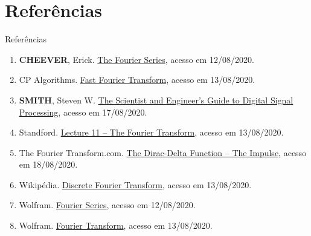 \section{Referências}

\begin{frame}[fragile]{Referências}

    \begin{enumerate}
        \item \textbf{CHEEVER}, Erick. \href{https://lpsa.swarthmore.edu/Fourier/Series/WhyFS.html}
            {The Fourier Series}, acesso em 12/08/2020.

        \item CP Algorithms. \href{https://cp-algorithms.com/algebra/fft.html}{Fast Fourier
            Transform}, acesso em 13/08/2020.
 
        \item \textbf{SMITH}, Steven W. \href{https://www.dspguide.com/ch12/2.htm}{The Scientist
            and Engineer's Guide to Digital Signal Processing}, acesso em 17/08/2020.
 
        \item Standford. \href{https://web.stanford.edu/class/ee102/lectures/fourtran}{Lecture 11
            -- The Fourier Transform}, acesso em 13/08/2020.

        \item The Fourier Transform.com. \href{http://www.thefouriertransform.com/pairs/impulse.php}{The Dirac-Delta Function -- The Impulse}, acesso em 18/08/2020.

        \item Wikipédia. \href{https://en.wikipedia.org/wiki/Discrete_Fourier_transform}{Discrete
            Fourier Transform}, acesso em 13/08/2020.
 
        \item Wolfram. \href{https://mathworld.wolfram.com/FourierSeries.html}{Fourier Series},
            acesso em 12/08/2020.

        \item Wolfram. \href{https://mathworld.wolfram.com/FourierTransform.html}{Fourier
            Transform}, acesso em 13/08/2020.
 

    \end{enumerate}

\end{frame}
